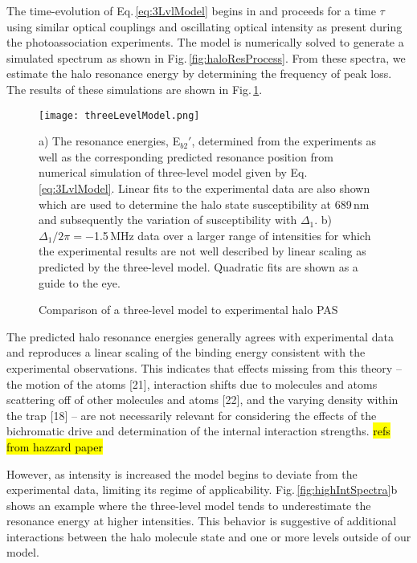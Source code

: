 The time-evolution of Eq.\,\ref{eq:3LvlModel} begins in  and proceeds for a time $\tau$ using similar optical couplings and oscillating optical intensity as present during the photoassociation experiments.
The model is numerically solved to generate a simulated spectrum as shown in Fig.\,\ref{fig:haloResProcess}.
From these spectra, we estimate the halo resonance energy by determining the frequency of peak loss.
The results of these simulations are shown in Fig.\,\ref{fig:3LvlModel}.
	\begin{figure}
		\centerline{
		\texttt{[image: threeLevelModel.png]}}
		\caption{Comparison of a three-level model to experimental halo PAS}{a) The resonance energies, E$_{b2}'$, determined from  the experiments as well as the corresponding predicted resonance position from numerical simulation of three-level model given by Eq.\,\ref{eq:3LvlModel}. Linear fits to the experimental data are also shown which are used to determine the halo state susceptibility at 689\,nm and subsequently the variation of susceptibility with $\Delta_1$. b) $\Delta_1/2 \pi = -$1.5\,MHz data over a larger range of intensities for which the experimental results are not well described by linear scaling as predicted by the three-level model. Quadratic fits are shown as a guide to the eye.}
		\label{fig:3LvlModel}
	\end{figure} 
The predicted halo resonance energies generally agrees with experimental data and reproduces a linear scaling of the binding energy consistent with the experimental observations.
This indicates that effects missing from this theory – the motion of the atoms [21], interaction shifts due to molecules and atoms scattering off of other molecules and atoms [22], and the varying density within the trap [18] – are not necessarily relevant for considering the effects of the bichromatic drive and determination of the internal interaction strengths.
\hl{refs from hazzard paper}

However, as intensity is increased the model begins to deviate from the experimental data, limiting its regime of applicability.
Fig.\,\ref{fig:highIntSpectra}b shows an example where the three-level model tends to underestimate the resonance energy at higher intensities.
This behavior is suggestive of additional interactions between the halo molecule state and one or more levels outside of our model.

